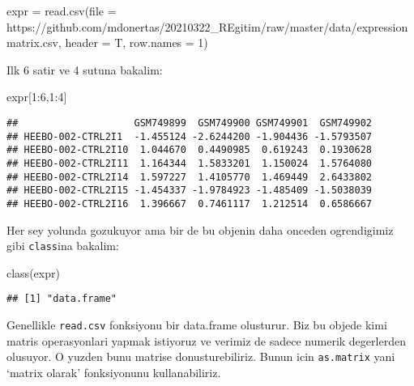 \documentclass[
]{book}
\newenvironment{Shaded}{\begin{snugshade}}{\end{snugshade}}
\newcommand{\AttributeTok}[1]{\textcolor[rgb]{0.77,0.63,0.00}{#1}}
\newcommand{\DecValTok}[1]{\textcolor[rgb]{0.00,0.00,0.81}{#1}}
\newcommand{\FunctionTok}[1]{\textcolor[rgb]{0.00,0.00,0.00}{#1}}
\newcommand{\NormalTok}[1]{#1}
\newcommand{\OtherTok}[1]{\textcolor[rgb]{0.56,0.35,0.01}{#1}}
\newcommand{\SpecialCharTok}[1]{\textcolor[rgb]{0.00,0.00,0.00}{#1}}
\newcommand{\StringTok}[1]{\textcolor[rgb]{0.31,0.60,0.02}{#1}}
\begin{document}
\begin{Shaded}
\begin{Highlighting}[]
\NormalTok{expr }\OtherTok{=} \FunctionTok{read.csv}\NormalTok{(}\AttributeTok{file =} \StringTok{\textquotesingle{}https://github.com/mdonertas/20210322\_REgitim/raw/master/data/expressionmatrix.csv\textquotesingle{}}\NormalTok{, }
                \AttributeTok{header =}\NormalTok{ T, }
                \AttributeTok{row.names =} \DecValTok{1}\NormalTok{)}
\end{Highlighting}
\end{Shaded}

Ilk 6 satir ve 4 sutuna bakalim:

\begin{Shaded}
\begin{Highlighting}[]
\NormalTok{expr[}\DecValTok{1}\SpecialCharTok{:}\DecValTok{6}\NormalTok{,}\DecValTok{1}\SpecialCharTok{:}\DecValTok{4}\NormalTok{]}
\end{Highlighting}
\end{Shaded}

\begin{verbatim}
##                    GSM749899  GSM749900 GSM749901  GSM749902
## HEEBO-002-CTRL2I1  -1.455124 -2.6244200 -1.904436 -1.5793507
## HEEBO-002-CTRL2I10  1.044670  0.4490985  0.619243  0.1930628
## HEEBO-002-CTRL2I11  1.164344  1.5833201  1.150024  1.5764080
## HEEBO-002-CTRL2I14  1.597227  1.4105770  1.469449  2.6433802
## HEEBO-002-CTRL2I15 -1.454337 -1.9784923 -1.485409 -1.5038039
## HEEBO-002-CTRL2I16  1.396667  0.7461117  1.212514  0.6586667
\end{verbatim}

Her sey yolunda gozukuyor ama bir de bu objenin daha onceden ogrendigimiz gibi \texttt{class}ina bakalim:

\begin{Shaded}
\begin{Highlighting}[]
\FunctionTok{class}\NormalTok{(expr)}
\end{Highlighting}
\end{Shaded}

\begin{verbatim}
## [1] "data.frame"
\end{verbatim}

Genellikle \texttt{read.csv} fonksiyonu bir data.frame olusturur. Biz bu objede kimi matris operasyonlari yapmak istiyoruz ve verimiz de sadece numerik degerlerden olusuyor. O yuzden bunu matrise donusturebiliriz. Bunun icin \texttt{as.matrix} yani `matrix olarak' fonksiyonunu kullanabiliriz.
\end{document}
